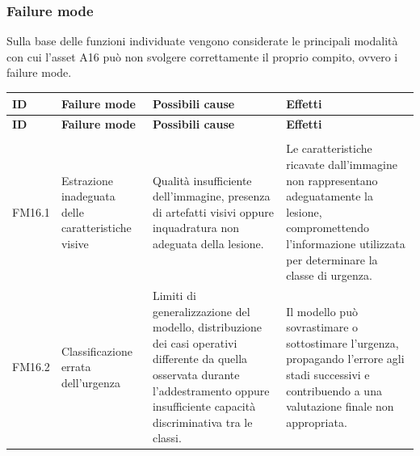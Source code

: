 \subsubsection{Failure mode}
Sulla base delle funzioni individuate vengono considerate le principali modalità con cui l'asset A16 può non svolgere correttamente il proprio compito, ovvero i failure mode.

{
\small
{}
\setlength{\tabcolsep}{4pt}
\renewcommand{\arraystretch}{1.08}

\begin{xltabular}{\textwidth}{
    >{\raggedright\arraybackslash}p{1.1cm}
    >{\raggedright\arraybackslash}p{3cm}
    >{\raggedright\arraybackslash}p{5cm}
    X
}

\toprule

\textbf{ID} &
\textbf{Failure mode} &
\textbf{Possibili cause} &
\textbf{Effetti} \\

\midrule

\endfirsthead

\toprule

\textbf{ID} &
\textbf{Failure mode} &
\textbf{Possibili cause} &
\textbf{Effetti} \\

\midrule

\endhead

 \\
\endfoot

\endlastfoot


FM16.1 &

Estrazione inadeguata delle caratteristiche visive &

Qualità insufficiente dell'immagine, presenza di artefatti visivi
oppure inquadratura non adeguata della lesione. &

Le caratteristiche ricavate dall'immagine non rappresentano
adeguatamente la lesione, compromettendo l'informazione utilizzata
per determinare la classe di urgenza. \\

\midrule


FM16.2 &

Classificazione errata dell'urgenza &

Limiti di generalizzazione del modello, distribuzione dei casi
operativi differente da quella osservata durante l'addestramento
oppure insufficiente capacità discriminativa tra le classi. &

Il modello può sovrastimare o sottostimare l'urgenza, propagando
l'errore agli stadi successivi e contribuendo a una valutazione
finale non appropriata. \\


\end{xltabular}}
